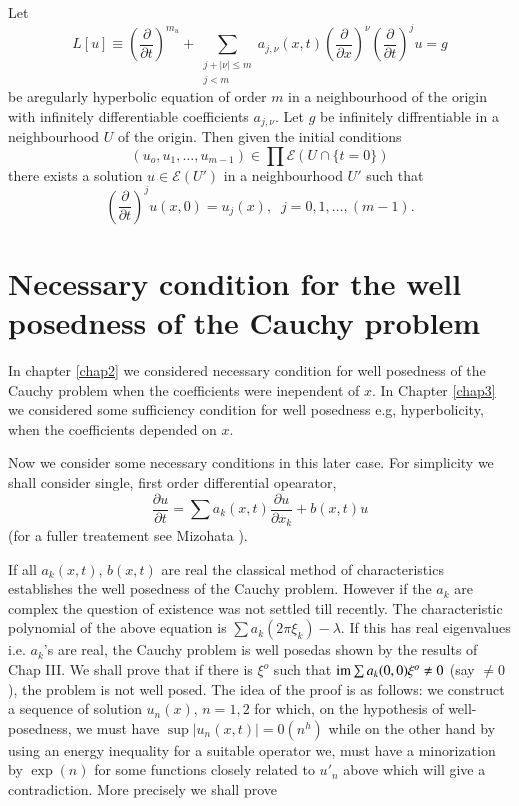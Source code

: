 \begin{corollary}\label{chap3-sec8-coro5} %
 Let 
 \begin{equation*}
L \left[  u \right]  \equiv \left( \frac{\partial}{\partial t}
\right)^{m_u} + \sum\limits_{\substack{ j + | \nu | \leq m  \\ j < m}} a_{j, \nu} (x,t)
\left(\frac{\partial}{\partial  x}\right)^\nu  \left(
\frac{\partial}{\partial t} \right)^j 
u = g  \tag{8.23} \label{chap3-eq8.23}
 \end{equation*} 
be a\pageoriginale regularly hyperbolic equation of order $m$ in a
neighbourhood of the origin with infinitely  differentiable
coefficients $a_{j,\nu}$. Let $g$ be infinitely diffrentiable in a
neighbourhood $U$ of the origin. Then given the initial conditions  
$$
(u_o, u_1, \ldots ,  u_{m-1} )\in \prod \mathscr{E}( U \cap \{ t = 0
\}) 
$$
there exists a solution $u \in \mathscr{E}(U')$ in a neighbourhood
$U'$ such that  
$$
\left(\frac{\partial}{\partial t}\right)^j u (x, 0) = u_j (x), \;\; j
=0, 1,  \ldots, (m-1). 
$$
\end{corollary}

\section[Necessary condition for the well posedness.....]{Necessary
  condition for the well posedness of the Cauchy problem}\label{chap3-sec9}%

In chapter \ref{chap2} we considered necessary condition for well posedness of
the Cauchy problem when the coefficients were inependent of $x$. In
Chapter \ref{chap3} we considered some sufficiency condition for well
posedness e.g, hyperbolicity, when the coefficients depended on $x$.  

Now we consider some necessary conditions in this later case. For
simplicity we shall consider single, first order differential
opearator, 
\begin{equation*}
\frac{\partial u}{\partial t} = \sum a_k (x, t) \frac{\partial
  u}{\partial x_k} + b(x, t)u \tag{9.1}\label{chap3-eq9.1}
\end{equation*}
(for a fuller treatement see Mizohata \cite{key3}).

If all $a_k (x, t)$, $b(x, t)$ are real the classical method of
characteristics establishes the well posedness of the Cauchy
problem. However if the $a_k$ are complex the question of existence
was not settled till recently. The characteristic polynomial of the
above equation is $\sum a_k (2 \pi \xi_k) - \lambda$. If this has real
eigenvalues i.e. $a_k$'s are real, the Cauchy problem is well
posed\pageoriginale as 
shown by the results  of Chap III. We shall prove that if there is
$\xi^o$ such that $\operatorname{im} \sum a_k (0, 0) \xi^o \neq 0$ (say $\neq 0$),
the problem is not well posed. The idea of the proof is as follows: we
construct a sequence of solution $u_n (x)$, $n = 1, 2$ for which, on
the hypothesis of well-posedness, we must have $\sup |u_n (x, t)| =
0(n^h)$ while on the other hand by using an energy inequality for a
suitable operator we, must have a minorization by $\exp(n)$ for some
functions closely related to $u'_n$ above which will give a
contradiction. More precisely we shall prove 

